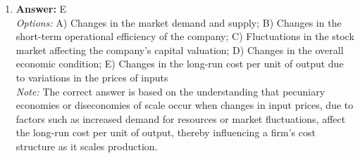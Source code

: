 \documentclass[12pt]{article}
\begin{document}
\begin{enumerate}[label=\arabic*.]
\\ \textit{Note:} Removing large outliers from the data can help achieve normality in the distribution, as outliers often distort statistical analyses and violate the assumption of normality necessary for many economic models.
\item \textbf{Answer:} E
\\ \textit{Options:} A) Changes in the market demand and supply; B) Changes in the short-term operational efficiency of the company; C) Fluctuations in the stock market affecting the company's capital valuation; D) Changes in the overall economic condition; E) Changes in the long-run cost per unit of output due to variations in the prices of inputs
\\ \textit{Note:} The correct answer is based on the understanding that pecuniary economies or diseconomies of scale occur when changes in input prices, due to factors such as increased demand for resources or market fluctuations, affect the long-run cost per unit of output, thereby influencing a firm's cost structure as it scales production.
\end{enumerate}
\end{document}
